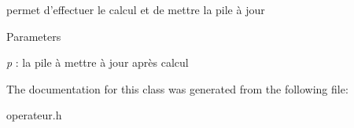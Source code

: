 permet d'effectuer le calcul et de mettre la pile à jour 


\begin{DoxyParams}{Parameters}
\item[{\em p}]: la pile à mettre à jour après calcul \end{DoxyParams}


The documentation for this class was generated from the following file:\begin{DoxyCompactItemize}
\item 
operateur.h\end{DoxyCompactItemize}
